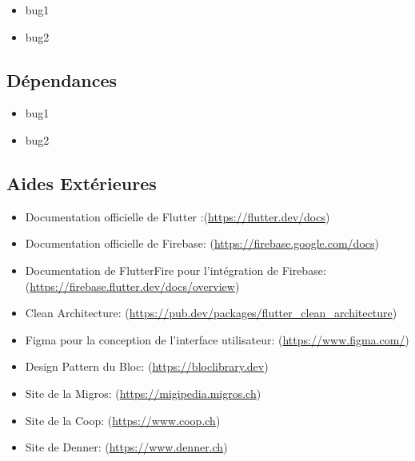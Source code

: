 \begin{itemize}[noitemsep]
    \item bug1
    \item bug2
\end{itemize}

\subsection{Dépendances}

\begin{itemize}[noitemsep]
    \item bug1
    \item bug2
\end{itemize}

\subsection{Aides Extérieures}

\begin{itemize}[noitemsep]
    \item Documentation officielle de Flutter :(\url{https://flutter.dev/docs})
    \item Documentation officielle de Firebase: (\url{https://firebase.google.com/docs})
    \item Documentation de FlutterFire pour l'intégration de Firebase: (\url{https://firebase.flutter.dev/docs/overview})
    \item Clean Architecture: (\url{https://pub.dev/packages/flutter_clean_architecture})
    \item Figma pour la conception de l'interface utilisateur: (\url{https://www.figma.com/})
    \item Design Pattern du Bloc: (\url{https://bloclibrary.dev})
    \item Site de la Migros: (\url{https://migipedia.migros.ch})
    \item Site de la Coop: (\url{https://www.coop.ch})
    \item Site de Denner: (\url{https://www.denner.ch})
\end{itemize}
